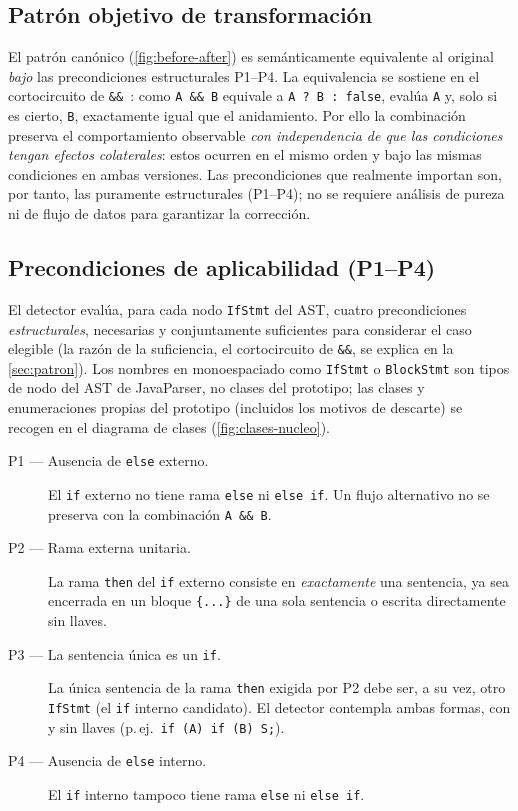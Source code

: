 \subsection{Patrón objetivo de transformación}
El patrón canónico (\autoref{fig:before-after}) es semánticamente equivalente
al original \emph{bajo} las precondiciones estructurales P1--P4. La equivalencia
se sostiene en el cortocircuito de \lstinline|&&|~\cite{jls17}: como \lstinline|A && B|
equivale a \lstinline|A ? B : false|, evalúa \lstinline|A| y, solo si es cierto,
\lstinline|B|, exactamente igual que el anidamiento. Por ello la combinación
preserva el comportamiento observable \emph{con independencia de que las
condiciones tengan efectos colaterales}: estos ocurren en el mismo orden y bajo
las mismas condiciones en ambas versiones. Las precondiciones que realmente
importan son, por tanto, las puramente estructurales (P1--P4); no se requiere
análisis de pureza ni de flujo de datos para garantizar la corrección.

\subsection{Precondiciones de aplicabilidad (P1--P4)}
\label{sec:precondiciones}
El detector evalúa, para cada nodo \lstinline|IfStmt| del AST, cuatro
precondiciones \emph{estructurales}, necesarias y conjuntamente suficientes
para considerar el caso elegible (la razón de la suficiencia, el cortocircuito
de \lstinline|&&|, se explica en la \autoref{sec:patron}). Los nombres en monoespaciado como
\lstinline|IfStmt| o \lstinline|BlockStmt| son
tipos de nodo del AST de JavaParser, no clases del prototipo; las clases y
enumeraciones propias del prototipo (incluidos los motivos de descarte) se
recogen en el diagrama de clases (\autoref{fig:clases-nucleo}).

\begin{description}
  \item[P1 — Ausencia de \texttt{else} externo.] El \lstinline|if| externo
  no tiene rama \lstinline|else| ni \lstinline|else if|. Un flujo
  alternativo no se preserva con la combinación \lstinline|A && B|.
  \item[P2 — Rama externa unitaria.] La rama \lstinline|then| del
  \lstinline|if| externo consiste en \emph{exactamente} una sentencia, ya
  sea encerrada en un bloque \lstinline|{...}| de una sola sentencia o
  escrita directamente sin llaves.
  \item[P3 — La sentencia única es un \texttt{if}.] La única sentencia de la
  rama \lstinline|then| exigida por P2 debe ser, a su vez, otro
  \lstinline|IfStmt| (el \lstinline|if| interno candidato). El detector
  contempla ambas formas, con y sin llaves (p.\,ej.\
  \lstinline|if (A) if (B) S;|).
  \item[P4 — Ausencia de \texttt{else} interno.] El \lstinline|if| interno
  tampoco tiene rama \lstinline|else| ni \lstinline|else if|.
\end{description}

